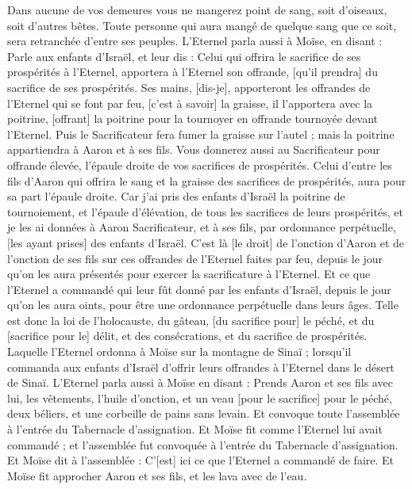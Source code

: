 \begin{multicols}{2}
Dans aucune de vos demeures vous ne mangerez point de sang, soit d'oiseaux, soit d'autres bêtes.
Toute personne qui aura mangé de quelque sang que ce soit, sera retranchée d'entre ses peuples.
L'Eternel parla aussi à Moïse, en disant :
Parle aux enfants d'Israël, et leur dis : Celui qui offrira le sacrifice de ses prospérités à l'Eternel, apportera à l'Eternel son offrande, [qu'il prendra] du sacrifice de ses prospérités.
Ses mains, [dis-je], apporteront les offrandes de l'Eternel qui se font par feu, [c'est à savoir] la graisse, il l'apportera avec la poitrine, [offrant] la poitrine pour la tournoyer en offrande tournoyée devant l'Eternel.
Puis le Sacrificateur fera fumer la graisse sur l'autel ; mais la poitrine appartiendra à Aaron et à ses fils.
Vous donnerez aussi au Sacrificateur pour offrande élevée, l'épaule droite de vos sacrifices de prospérités.
Celui d'entre les fils d'Aaron qui offrira le sang et la graisse des sacrifices de prospérités, aura pour sa part l'épaule droite.
Car j'ai pris des enfants d'Israël la poitrine de tournoiement, et l'épaule d'élévation, de tous les sacrifices de leurs prospérités, et je les ai données à Aaron Sacrificateur, et à ses fils, par ordonnance perpétuelle, [les ayant prises] des enfants d'Israël.
C'est là [le droit] de l'onction d'Aaron et de l'onction de ses fils sur ces offrandes de l'Eternel faites par feu, depuis le jour qu'on les aura présentés pour exercer la sacrificature à l'Eternel.
Et ce que l'Eternel a commandé qui leur fût donné par les enfants d'Israël, depuis le jour qu'on les aura oints, pour être une ordonnance perpétuelle dans leurs âges.
Telle est donc la loi de l'holocauste, du gâteau, [du sacrifice pour] le péché, et du [sacrifice pour le] délit, et des consécrations, et du sacrifice de prospérités.
Laquelle l'Eternel ordonna à Moïse sur la montagne de Sinaï ; lorsqu'il commanda aux enfants d'Israël d'offrir leurs offrandes à l'Eternel dans le désert de Sinaï.
\VerseOne{}L'Eternel parla aussi à Moïse en disant :
Prends Aaron et ses fils avec lui, les vêtements, l'huile d'onction, et un veau [pour le sacrifice] pour le péché, deux béliers, et une corbeille de pains sans levain.
Et convoque toute l'assemblée à l'entrée du Tabernacle d'assignation.
Et Moïse fit comme l'Eternel lui avait commandé ; et l'assemblée fut convoquée à l'entrée du Tabernacle d'assignation.
Et Moïse dit à l'assemblée : C'[est] ici ce que l'Eternel a commandé de faire.
Et Moïse fit approcher Aaron et ses fils, et les lava avec de l'eau.

\end{multicols}
